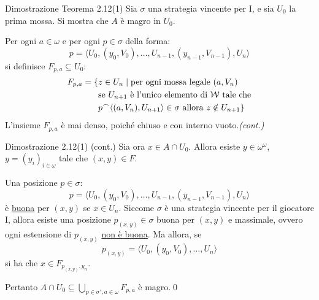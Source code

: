 \documentclass[babel]{beamer}
\renewcommand{\href}[2]{#2}
\begin{document}
\begin{frame}[label={sec:orgcde9e28}]{Dimostrazione Teorema 2.12(1)}
Sia \(\sigma\) una \href{../../../../../../../org/roam/20250513171520-giochi_di_gale_stewart.org}{strategia} \href{../../../../../../../org/roam/20250513171520-giochi_di_gale_stewart.org}{vincente} per I, e sia \(U_{0}\) la prima mossa. Si mostra che \(A\) è \href{../../../../../../../org/roam/20250419122752-insieme_magro.org}{magro} in \(U_{0}\).

Per ogni \(a \in \omega\) e per ogni \(p \in \sigma\) della forma:
\begin{equation*}
 p=\langle
 	U_{0},({y}_{0}, V_{0}), \dots, U_{n-1}, ({y}_{n-1}, V_{n-1}), U_{n}
 \rangle
\end{equation*}
si definisce \(F_{p,a} \subseteq U_{0}\):
\begin{align*}
 F_{p,a} = \{&z \in U_{n}\mid \text{per ogni mossa legale }(a, V_{n})\\
 &\text{se } U_{n+1}\text{ è l'unico elemento di }\mathcal{W}\text{ tale che}\\
 &p \concat \langle(a,V_{n}), U_{n+1}\rangle \in \sigma \text{ allora } z \notin U_{n+1}\}
\end{align*}
L'insieme \(F_{p,a}\) è mai denso, poiché chiuso e con interno vuoto.\hfill \textit{(cont.)}
\end{frame}
\begin{frame}[label={sec:orgde780d6}]{Dimostrazione 2.12(1) (cont.)}
Sia ora \(x \in A\cap U_{0}\). Allora esiste \(y \in \omega^{\omega}\), \(y=(y_{i})_{i \in\omega}\) tale che \((x,y) \in F\).

Una posizione \(p \in \sigma\):
\begin{equation*}
     p=\langle
     	U_{0},({y}_{0}, V_{0}), \dots, U_{n-1}, ({y}_{n-1}, V_{n-1}), U_{n}
     \rangle
\end{equation*}
è \uline{buona} per \((x,{y})\) se \(x \in U_{n}\). Siccome \(\sigma\) è una strategia vincente per il giocatore I, allora esiste una posizione \(p_{(x,y)} \in \sigma\) buona per \((x,y)\) e massimale, ovvero ogni estensione di \(p_{(x,y)}\) \uline{non è buona}. Ma allora, se
\begin{equation*}
 p_{(x,y)} = \langle U_{0}, (y_{0},V_{0}),\dots, U_{n}\rangle
\end{equation*}
si ha che \(x \in F_{p_{(x,y)}, y_{n}}\).

Pertanto \(A\cap U_{0} \subseteq \bigcup_{p \in \sigma', a \in \omega} F_{p,a}\) è magro.\qed
\end{frame}
\end{document}
